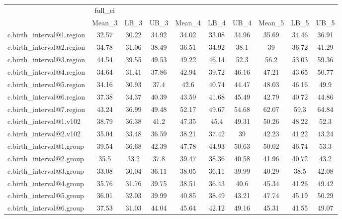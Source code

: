 \begin{tabular}{l*{9}{c}}
\hline\hline
                    &     full\_ci&            &            &            &            &            &            &            &            \\
                    &      Mean\_3&        LB\_3&        UB\_3&      Mean\_4&        LB\_4&        UB\_4&      Mean\_5&        LB\_5&        UB\_5\\
\midrule
c.birth\_interval@1.region&       32.57&       30.22&       34.92&       34.02&       33.08&       34.96&       35.69&       34.46&       36.91\\
c.birth\_interval@2.region&       34.78&       31.06&       38.49&       36.51&       34.92&        38.1&          39&       36.72&       41.29\\
c.birth\_interval@3.region&       44.54&       39.55&       49.53&       49.22&       46.14&        52.3&        56.2&       53.03&       59.36\\
c.birth\_interval@4.region&       34.64&       31.41&       37.86&       42.94&       39.72&       46.16&       47.21&       43.65&       50.77\\
c.birth\_interval@5.region&       34.16&       30.93&        37.4&        42.6&       40.74&       44.47&       48.03&       46.16&        49.9\\
c.birth\_interval@6.region&       37.38&       34.37&       40.39&       43.59&       41.68&       45.49&       42.79&       40.72&       44.86\\
c.birth\_interval@7.region&       43.24&       36.99&       49.48&       52.17&       49.67&       54.68&       62.07&        59.3&       64.84\\
c.birth\_interval@1.v102&       38.79&       36.38&        41.2&       47.35&        45.4&       49.31&       50.26&       48.22&        52.3\\
c.birth\_interval@2.v102&       35.04&       33.48&       36.59&       38.21&       37.42&          39&       42.23&       41.22&       43.24\\
c.birth\_interval@1.group&       39.54&       36.68&       42.39&       47.78&       44.93&       50.63&       50.02&       46.74&        53.3\\
c.birth\_interval@2.group&        35.5&        33.2&        37.8&       39.47&       38.36&       40.58&       41.96&       40.72&        43.2\\
c.birth\_interval@3.group&       33.08&       30.04&       36.11&       38.05&       36.11&       39.99&       40.29&        38.5&       42.08\\
c.birth\_interval@4.group&       35.76&       31.76&       39.75&       38.51&       36.43&        40.6&       45.34&       41.26&       49.42\\
c.birth\_interval@5.group&       36.01&       32.03&       39.99&       40.85&       38.49&       43.21&       47.74&       45.19&       50.29\\
c.birth\_interval@6.group&       37.53&       31.03&       44.04&       45.64&       42.12&       49.16&       45.31&       41.55&       49.07\\
\hline\hline
\end{tabular}
